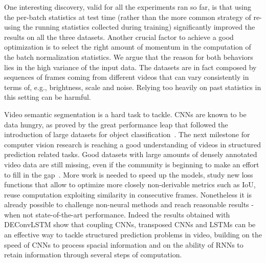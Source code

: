 One interesting discovery, valid for all the experiments ran so far, is
that using the per-batch statistics at test time (rather than the more common
strategy of re-using the running statistics collected during training)
significantly improved the results on all the three datasets. Another crucial
factor to achieve a good optimization is to select the right amount of momentum
in the computation of the batch normalization statistics. We argue that the
reason for both behaviors lies in the high variance of the input data. The
datasets are in fact composed by sequences of frames coming from different
videos that can vary consistently in terms of, e.g., brightness, scale and
noise. Relying too heavily on past statistics in this setting can be harmful.

Video semantic segmentation is a hard task to tackle. CNNs are known to be
data hungry, as proved by the great performance leap that followed the
introduction of large datasets for object classification~\citep{ILSVRCarxiv14}.
The next milestone for computer vision research is reaching a good
understanding of videos in structured prediction related tasks. Good datasets
with large amounts of densely annotated video data are still missing, even if
the community is beginning to make an effort to fill in the gap~\citep[
see~e.g.,~][]{Perazzi2016,lin2014microsoft}. More work is needed to speed up
the models, study new loss functions that allow to optimize more closely
non-derivable metrics such as IoU, reuse computation exploiting similarity in
consecutive frames. Nonetheless it is already possible to challenge non-neural
methods and reach reasonable results - when not state-of-the-art performance.
Indeed the results obtained with DEConvLSTM show that coupling CNNs, transposed
CNNs and LSTMs can be an effective way to tackle structured prediction problems
in video, building on the speed of CNNs to process spacial information and on
the ability of RNNs to retain information through several steps of computation.


